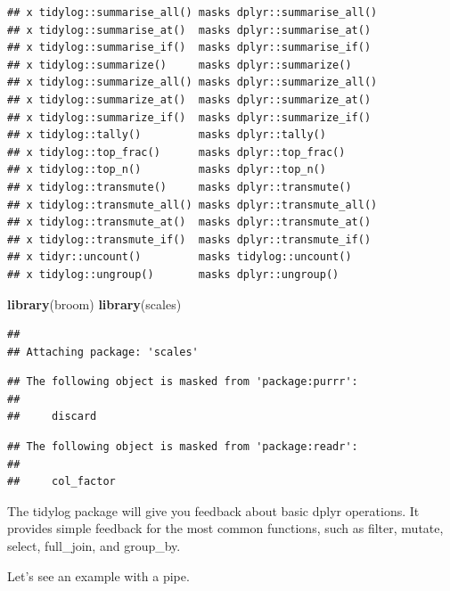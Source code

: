 \documentclass[
]{book}
\newenvironment{Shaded}{\begin{snugshade}}{\end{snugshade}}
\newcommand{\KeywordTok}[1]{\textcolor[rgb]{0.13,0.29,0.53}{\textbf{#1}}}
\newcommand{\NormalTok}[1]{#1}
\begin{document}
\begin{verbatim}
## x tidylog::summarise_all() masks dplyr::summarise_all()
## x tidylog::summarise_at()  masks dplyr::summarise_at()
## x tidylog::summarise_if()  masks dplyr::summarise_if()
## x tidylog::summarize()     masks dplyr::summarize()
## x tidylog::summarize_all() masks dplyr::summarize_all()
## x tidylog::summarize_at()  masks dplyr::summarize_at()
## x tidylog::summarize_if()  masks dplyr::summarize_if()
## x tidylog::tally()         masks dplyr::tally()
## x tidylog::top_frac()      masks dplyr::top_frac()
## x tidylog::top_n()         masks dplyr::top_n()
## x tidylog::transmute()     masks dplyr::transmute()
## x tidylog::transmute_all() masks dplyr::transmute_all()
## x tidylog::transmute_at()  masks dplyr::transmute_at()
## x tidylog::transmute_if()  masks dplyr::transmute_if()
## x tidyr::uncount()         masks tidylog::uncount()
## x tidylog::ungroup()       masks dplyr::ungroup()
\end{verbatim}

\begin{Shaded}
\begin{Highlighting}[]
\KeywordTok{library}\NormalTok{(broom)}
\KeywordTok{library}\NormalTok{(scales)}
\end{Highlighting}
\end{Shaded}

\begin{verbatim}
## 
## Attaching package: 'scales'
\end{verbatim}

\begin{verbatim}
## The following object is masked from 'package:purrr':
## 
##     discard
\end{verbatim}

\begin{verbatim}
## The following object is masked from 'package:readr':
## 
##     col_factor
\end{verbatim}

The tidylog package will give you feedback about basic dplyr operations.
It provides simple feedback for the most common functions, such as filter, mutate, select, full\_join, and group\_by.

Let's see an example with a pipe.
\end{document}
